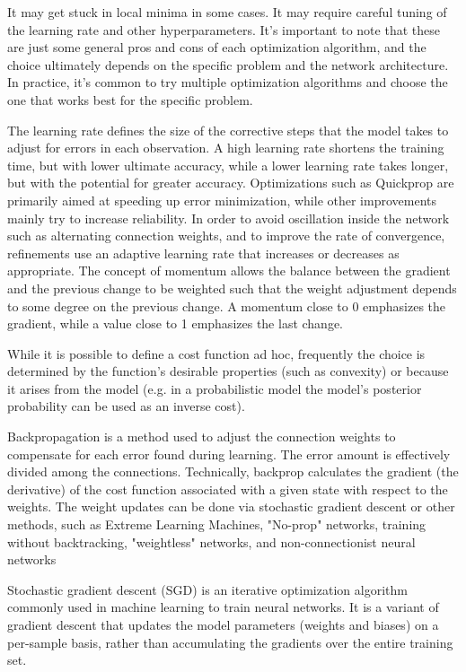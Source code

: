 It may get stuck in local minima in some cases.
It may require careful tuning of the learning rate and other hyperparameters.
It's important to note that these are just some general pros and cons of each optimization algorithm, and the choice ultimately depends on the specific problem and the network architecture. In practice, it's common to try multiple optimization algorithms and choose the one that works best for the specific problem.

The learning rate defines the size of the corrective steps that the model takes to adjust for errors in each observation. A high learning rate shortens the training time, but with lower ultimate accuracy, while a lower learning rate takes longer, but with the potential for greater accuracy. Optimizations such as Quickprop are primarily aimed at speeding up error minimization, while other improvements mainly try to increase reliability. In order to avoid oscillation inside the network such as alternating connection weights, and to improve the rate of convergence, refinements use an adaptive learning rate that increases or decreases as appropriate. The concept of momentum allows the balance between the gradient and the previous change to be weighted such that the weight adjustment depends to some degree on the previous change. A momentum close to 0 emphasizes the gradient, while a value close to 1 emphasizes the last change.

While it is possible to define a cost function ad hoc, frequently the choice is determined by the function's desirable properties (such as convexity) or because it arises from the model (e.g. in a probabilistic model the model's posterior probability can be used as an inverse cost).

Backpropagation is a method used to adjust the connection weights to compensate for each error found during learning. The error amount is effectively divided among the connections. Technically, backprop calculates the gradient (the derivative) of the cost function associated with a given state with respect to the weights. The weight updates can be done via stochastic gradient descent or other methods, such as Extreme Learning Machines, "No-prop" networks, training without backtracking, "weightless" networks, and non-connectionist neural networks

Stochastic gradient descent (SGD) is an iterative optimization algorithm commonly used in machine learning to train neural networks. It is a variant of gradient descent that updates the model parameters (weights and biases) on a per-sample basis, rather than accumulating the gradients over the entire training set.

